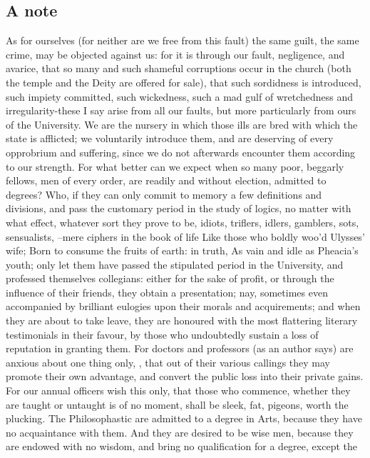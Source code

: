 \subsection{A note}

As for ourselves (for neither are we free from this fault) the same guilt, the
same crime, may be objected against us: for it is through our fault,
negligence, and avarice, that so many and such shameful corruptions occur in
the church (both the temple and the Deity are offered for sale), that such
sordidness is introduced, such impiety committed, such wickedness, such a mad
gulf of wretchedness and irregularity-these I say arise from all our faults,
but more particularly from ours of the University. We are the nursery in which
those ills are bred with which the state is afflicted; we voluntarily introduce
them, and are deserving of every opprobrium and suffering, since we do not
afterwards encounter them according to our strength. For what better can we
expect when so many poor, beggarly fellows, men of every order, are readily and
without election, admitted to degrees? Who, if they can only commit to memory a
few definitions and divisions, and pass the customary period in the study of
logics, no matter with what effect, whatever sort they prove to be, idiots,
triflers, idlers, gamblers, sots, sensualists, --mere ciphers in the book of
life Like those who boldly woo'd Ulysses' wife; Born to consume the fruits of
earth: in truth, As vain and idle as Pheacia's youth; only let them have passed
the stipulated period in the University, and professed themselves collegians:
either for the sake of profit, or through the influence of their friends, they
obtain a presentation; nay, sometimes even accompanied by brilliant eulogies
upon their morals and acquirements; and when they are about to take leave, they
are honoured with the most flattering literary testimonials in their favour, by
those who undoubtedly sustain a loss of reputation in granting them. For
doctors and professors (as an author says) are anxious about one thing only,
, that out of their various callings they may promote their own advantage,
and convert the public loss into their private gains. For our annual officers
wish this only, that those who commence, whether they are taught or untaught is
of no moment, shall be sleek, fat, pigeons, worth the plucking. The
Philosophastic are admitted to a degree in Arts, because they have no
acquaintance with them. And they are desired to be wise men, because they are
endowed with no wisdom, and bring no qualification for a degree, except the
